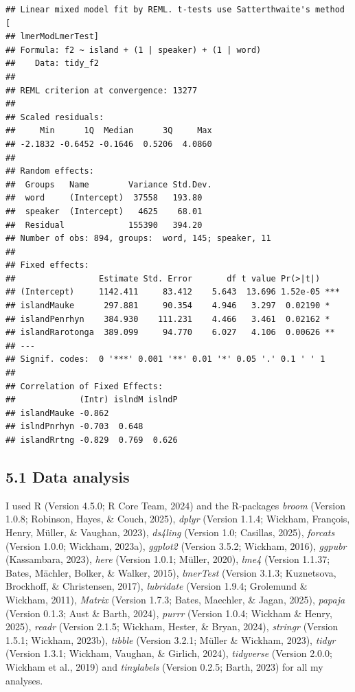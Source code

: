 \documentclass[
  ,man,floatsintext]{apa6}
\begin{document}
\begin{verbatim}
## Linear mixed model fit by REML. t-tests use Satterthwaite's method [
## lmerModLmerTest]
## Formula: f2 ~ island + (1 | speaker) + (1 | word)
##    Data: tidy_f2
## 
## REML criterion at convergence: 13277
## 
## Scaled residuals: 
##     Min      1Q  Median      3Q     Max 
## -2.1832 -0.6452 -0.1646  0.5206  4.0860 
## 
## Random effects:
##  Groups   Name        Variance Std.Dev.
##  word     (Intercept)  37558   193.80  
##  speaker  (Intercept)   4625    68.01  
##  Residual             155390   394.20  
## Number of obs: 894, groups:  word, 145; speaker, 11
## 
## Fixed effects:
##                 Estimate Std. Error       df t value Pr(>|t|)    
## (Intercept)     1142.411     83.412    5.643  13.696 1.52e-05 ***
## islandMauke      297.881     90.354    4.946   3.297  0.02190 *  
## islandPenrhyn    384.930    111.231    4.466   3.461  0.02162 *  
## islandRarotonga  389.099     94.770    6.027   4.106  0.00626 ** 
## ---
## Signif. codes:  0 '***' 0.001 '**' 0.01 '*' 0.05 '.' 0.1 ' ' 1
## 
## Correlation of Fixed Effects:
##             (Intr) islndM islndP
## islandMauke -0.862              
## islndPnrhyn -0.703  0.648       
## islandRrtng -0.829  0.769  0.626
\end{verbatim}

\subsection{5.1 Data analysis}\label{data-analysis}

I used R (Version 4.5.0; R Core Team, 2024) and the R-packages \emph{broom} (Version 1.0.8; Robinson, Hayes, \& Couch, 2025), \emph{dplyr} (Version 1.1.4; Wickham, François, Henry, Müller, \& Vaughan, 2023), \emph{ds4ling} (Version 1.0; Casillas, 2025), \emph{forcats} (Version 1.0.0; Wickham, 2023a), \emph{ggplot2} (Version 3.5.2; Wickham, 2016), \emph{ggpubr} (Kassambara, 2023), \emph{here} (Version 1.0.1; Müller, 2020), \emph{lme4} (Version 1.1.37; Bates, Mächler, Bolker, \& Walker, 2015), \emph{lmerTest} (Version 3.1.3; Kuznetsova, Brockhoff, \& Christensen, 2017), \emph{lubridate} (Version 1.9.4; Grolemund \& Wickham, 2011), \emph{Matrix} (Version 1.7.3; Bates, Maechler, \& Jagan, 2025), \emph{papaja} (Version 0.1.3; Aust \& Barth, 2024), \emph{purrr} (Version 1.0.4; Wickham \& Henry, 2025), \emph{readr} (Version 2.1.5; Wickham, Hester, \& Bryan, 2024), \emph{stringr} (Version 1.5.1; Wickham, 2023b), \emph{tibble} (Version 3.2.1; Müller \& Wickham, 2023), \emph{tidyr} (Version 1.3.1; Wickham, Vaughan, \& Girlich, 2024), \emph{tidyverse} (Version 2.0.0; Wickham et al., 2019) and \emph{tinylabels} (Version 0.2.5; Barth, 2023) for all my analyses.
\end{document}
